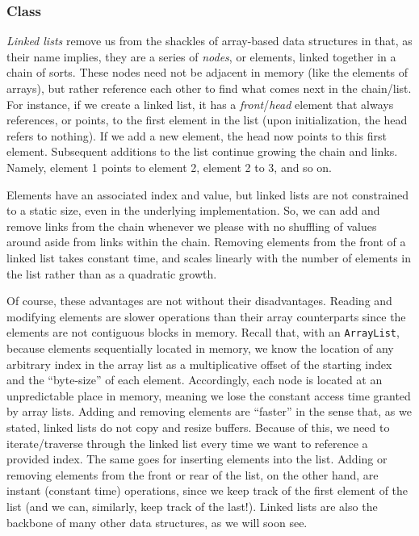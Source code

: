 \subsubsection*{ Class}
\emph{Linked lists} remove us from the shackles of array-based data structures in that, as their name implies, they are a series of \emph{nodes}, or elements, linked together in a chain of sorts. 
These nodes need not be adjacent in memory (like the elements of arrays), but rather reference each other to find what comes next in the chain/list. 
For instance, if we create a linked list, it has a \emph{front}/\emph{head} element that always references, or points, to the first element in the list (upon initialization, the head refers to nothing). 
If we add a new element, the head now points to this first element. 
Subsequent additions to the list continue growing the chain and links. 
Namely, element 1 points to element 2, element 2 to 3, and so on. 

Elements have an associated index and value, but linked lists are not constrained to a static size, even in the underlying implementation. 
So, we can add and remove links from the chain whenever we please with no shuffling of values around aside from links within the chain. 
Removing elements from the front of a linked list takes constant time, and scales linearly with the number of elements in the list rather than as a quadratic growth.

Of course, these advantages are not without their disadvantages. 
Reading and modifying elements are slower operations than their array counterparts since the elements are not contiguous blocks in memory. 
Recall that, with an \texttt{ArrayList}, because elements sequentially located in memory, we know the location of any arbitrary index in the array list as a multiplicative offset of the starting index and the ``byte-size'' of each element. 
Accordingly, each node is located at an unpredictable place in memory, meaning we lose the constant access time granted by array lists.
Adding and removing elements are ``faster'' in the sense that, as we stated, linked lists do not copy and resize buffers. 
Because of this, we need to iterate/traverse through the linked list every time we want to reference a provided index. 
The same goes for inserting elements into the list. 
Adding or removing elements from the front or rear of the list, on the other hand, are instant (constant time) operations, since we keep track of the first element of the list (and we can, similarly, keep track of the last!). 
Linked lists are also the backbone of many other data structures, as we will soon see.

